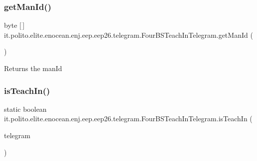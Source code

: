 \subsubsection{\texorpdfstring{get\+Man\+Id()}{getManId()}}
{\footnotesize\ttfamily byte \mbox{[}$\,$\mbox{]} it.\+polito.\+elite.\+enocean.\+enj.\+eep.\+eep26.\+telegram.\+Four\+B\+S\+Teach\+In\+Telegram.\+get\+Man\+Id (\begin{DoxyParamCaption}{ }\end{DoxyParamCaption})}

\begin{DoxyReturn}{Returns}
the man\+Id 
\end{DoxyReturn}
\hypertarget{classit_1_1polito_1_1elite_1_1enocean_1_1enj_1_1eep_1_1eep26_1_1telegram_1_1_four_b_s_teach_in_telegram_a454852c77af74d45f337a9b142066728}{}\label{classit_1_1polito_1_1elite_1_1enocean_1_1enj_1_1eep_1_1eep26_1_1telegram_1_1_four_b_s_teach_in_telegram_a454852c77af74d45f337a9b142066728} 
\subsubsection{\texorpdfstring{is\+Teach\+In()}{isTeachIn()}}
{\footnotesize\ttfamily static boolean it.\+polito.\+elite.\+enocean.\+enj.\+eep.\+eep26.\+telegram.\+Four\+B\+S\+Teach\+In\+Telegram.\+is\+Teach\+In (\begin{DoxyParamCaption}\item[{\hyperlink{classit_1_1polito_1_1elite_1_1enocean_1_1enj_1_1eep_1_1eep26_1_1telegram_1_1_four_b_s_telegram}{Four\+B\+S\+Telegram}}]{telegram }\end{DoxyParamCaption})\hspace{0.3cm}{\ttfamily [static]}}

\hypertarget{classit_1_1polito_1_1elite_1_1enocean_1_1enj_1_1eep_1_1eep26_1_1telegram_1_1_four_b_s_teach_in_telegram_a00507b2fb0204843438d3b37b91a80a2}{}\label{classit_1_1polito_1_1elite_1_1enocean_1_1enj_1_1eep_1_1eep26_1_1telegram_1_1_four_b_s_teach_in_telegram_a00507b2fb0204843438d3b37b91a80a2} 
